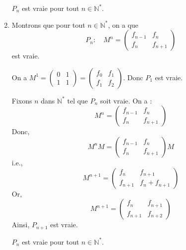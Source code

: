 \documentclass[a4paper, titlepage]{article}
\begin{document}
\begin{enumerate}
			 $P_n$ est vraie pour tout $n\in\mathbb{N}^*$.

		\item Montrons que pour tout $n\in\mathbb{N}^*$, on a que
			$$ P_n:\quad M^n = \begin{pmatrix} f_{n-1}&f_n\\f_n&f_{n+1} \end{pmatrix}  $$
			est vraie.

			 On a $M^1 = \begin{pmatrix} 0&1\\1&1 \end{pmatrix} = \begin{pmatrix} f_0&f_1\\f_1&f_2 \end{pmatrix}  $. Donc $P_1$ est vraie.

			 Fixons $n$ dans $\mathbb{N}^*$ tel que $P_n$ soit vraie. On a :
			$$ M^n = \begin{pmatrix} f_{n-1}&f_n\\f_n&f_{n+1} \end{pmatrix} $$
			Donc,
			$$ M^nM = \begin{pmatrix} f_{n-1}&f_n\\f_n&f_{n+1} \end{pmatrix} M $$
			i.e.,
			$$ M^{n+1} = \begin{pmatrix} f_{n}&f_{n+1}\\f_{n+1}&f_n+f_{n+1} \end{pmatrix} $$
			Or,
			$$ M^{n+1} = \begin{pmatrix} f_{n}&f_{n+1}\\f_{n+1}&f_{n+2} \end{pmatrix} $$
			Ainsi, $P_{n+1}$ est vraie.

			 $P_n$ est vraie pour tout $n\in\mathbb{N}^*$.
	\end{enumerate}
\end{document}
